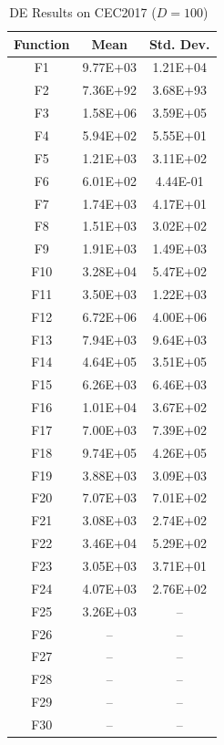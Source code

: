 \documentclass[11pt]{article}
\begin{document}
\begin{table}[htbp]
\centering
\caption{DE Results on CEC2017 ($D=100$)~\cite{mousavirad2021clude}}
\label{tab:de_cec2017_d100}
\small
\begin{tabular}{@{}ccc@{}}
\toprule
\textbf{Function} & \textbf{Mean} & \textbf{Std. Dev.} \\
\midrule
F1  & 9.77E+03 & 1.21E+04 \\
F2  & 7.36E+92 & 3.68E+93 \\
F3  & 1.58E+06 & 3.59E+05 \\
F4  & 5.94E+02 & 5.55E+01 \\
F5  & 1.21E+03 & 3.11E+02 \\
F6  & 6.01E+02 & 4.44E-01 \\
F7  & 1.74E+03 & 4.17E+01 \\
F8  & 1.51E+03 & 3.02E+02 \\
F9  & 1.91E+03 & 1.49E+03 \\
F10 & 3.28E+04 & 5.47E+02 \\
F11 & 3.50E+03 & 1.22E+03 \\
F12 & 6.72E+06 & 4.00E+06 \\
F13 & 7.94E+03 & 9.64E+03 \\
F14 & 4.64E+05 & 3.51E+05 \\
F15 & 6.26E+03 & 6.46E+03 \\
F16 & 1.01E+04 & 3.67E+02 \\
F17 & 7.00E+03 & 7.39E+02 \\
F18 & 9.74E+05 & 4.26E+05 \\
F19 & 3.88E+03 & 3.09E+03 \\
F20 & 7.07E+03 & 7.01E+02 \\
F21 & 3.08E+03 & 2.74E+02 \\
F22 & 3.46E+04 & 5.29E+02 \\
F23 & 3.05E+03 & 3.71E+01 \\
F24 & 4.07E+03 & 2.76E+02 \\
F25 & 3.26E+03 & -- \\
F26 & -- & -- \\
F27 & -- & -- \\
F28 & -- & -- \\
F29 & -- & -- \\
F30 & -- & -- \\
\bottomrule
\end{tabular}
\end{table}

\end{document}
